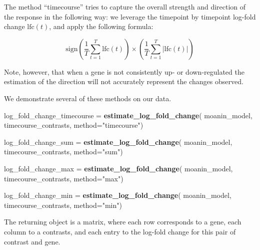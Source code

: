 \documentclass[9pt,a4paper,]{extarticle}
\newenvironment{Shaded}{\begin{snugshade}}{\end{snugshade}}
\newcommand{\DataTypeTok}[1]{\textcolor[rgb]{0.13,0.29,0.53}{#1}}
\newcommand{\KeywordTok}[1]{\textcolor[rgb]{0.13,0.29,0.53}{\textbf{#1}}}
\newcommand{\NormalTok}[1]{#1}
\newcommand{\StringTok}[1]{\textcolor[rgb]{0.31,0.60,0.02}{#1}}
\begin{document}
The method ``timecourse'' tries to capture the overall strength and direction of the response in the following way: we leverage the
timepoint by timepoint log-fold change \(\text{lfc}(t)\), and apply the
following formula:

\[\text{sign}\left(\frac{1}{T}\sum_{t = 1}^T \text{lfc}(t) \right) \times \left(\frac{1}{T}\sum_{t= 1}^T \lvert {\text{lfc}(t)} \lvert \right)\]

Note, however, that when a gene is not consistently up- or down-regulated the
estimation of the direction will not accurately represent the changes
observed.

We demonstrate several of these methods on our data.

\begin{Shaded}
\begin{Highlighting}[]
\NormalTok{log_fold_change_timecourse =}\StringTok{ }\KeywordTok{estimate_log_fold_change}\NormalTok{(}
\NormalTok{    moanin_model, timecourse_contrasts,  }\DataTypeTok{method=}\StringTok{"timecourse"}\NormalTok{)}

\NormalTok{log_fold_change_sum =}\StringTok{ }\KeywordTok{estimate_log_fold_change}\NormalTok{(}
\NormalTok{    moanin_model, timecourse_contrasts,  }\DataTypeTok{method=}\StringTok{"sum"}\NormalTok{)}

\NormalTok{log_fold_change_max =}\StringTok{ }\KeywordTok{estimate_log_fold_change}\NormalTok{(}
\NormalTok{    moanin_model, timecourse_contrasts, }\DataTypeTok{method=}\StringTok{"max"}\NormalTok{)}

\NormalTok{log_fold_change_min =}\StringTok{ }\KeywordTok{estimate_log_fold_change}\NormalTok{(}
\NormalTok{    moanin_model, timecourse_contrasts, }\DataTypeTok{method=}\StringTok{"min"}\NormalTok{)}
\end{Highlighting}
\end{Shaded}

The returning object is a matrix, where each row corresponds to a gene,
each column to a contrasts, and each entry to the log-fold change for this
pair of contrast and gene.
\end{document}
